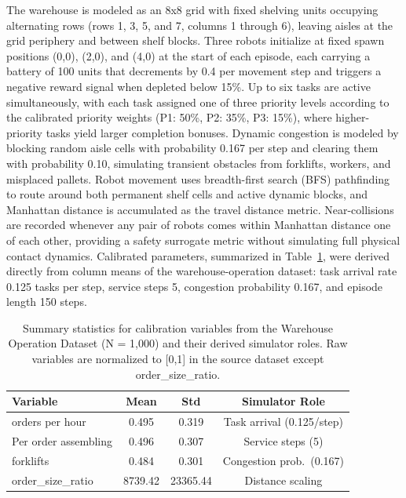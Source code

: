 \documentclass[conference]{IEEEtran}
\begin{document}
The warehouse is modeled as an 8x8 grid with fixed shelving units occupying alternating rows (rows 1, 3, 5, and 7, columns 1 through 6), leaving aisles at the grid periphery and between shelf blocks.
Three robots initialize at fixed spawn positions (0,0), (2,0), and (4,0) at the start of each episode, each carrying a battery of 100 units that decrements by 0.4 per movement step and triggers a negative reward signal when depleted below 15\%.
Up to six tasks are active simultaneously, with each task assigned one of three priority levels according to the calibrated priority weights (P1: 50\%, P2: 35\%, P3: 15\%), where higher-priority tasks yield larger completion bonuses.
Dynamic congestion is modeled by blocking random aisle cells with probability 0.167 per step and clearing them with probability 0.10, simulating transient obstacles from forklifts, workers, and misplaced pallets.
Robot movement uses breadth-first search (BFS) pathfinding to route around both permanent shelf cells and active dynamic blocks, and Manhattan distance is accumulated as the travel distance metric.
Near-collisions are recorded whenever any pair of robots comes within Manhattan distance one of each other, providing a safety surrogate metric without simulating full physical contact dynamics.
Calibrated parameters, summarized in Table~\ref{tab:DatasetSummary}, were derived directly from column means of the warehouse-operation dataset: task arrival rate 0.125 tasks per step, service steps 5, congestion probability 0.167, and episode length 150 steps.

\begin{table}[!ht]
\centering
\caption{Summary statistics for calibration variables from the Warehouse Operation Dataset (N = 1,000) and their derived simulator roles. Raw variables are normalized to [0,1] in the source dataset except order\_size\_ratio.}
\label{tab:DatasetSummary}
\renewcommand{\arraystretch}{1.1}
\begin{tabular}{|l|c|c|c|}
\hline
\textbf{Variable} & \textbf{Mean} & \textbf{Std} & \textbf{Simulator Role} \\
\hline
orders per hour & 0.495 & 0.319 & Task arrival (0.125/step) \\
Per order assembling & 0.496 & 0.307 & Service steps (5) \\
forklifts & 0.484 & 0.301 & Congestion prob.\ (0.167) \\
order\_size\_ratio & 8739.42 & 23365.44 & Distance scaling \\
\hline
\end{tabular}
\end{table}
\end{document}
